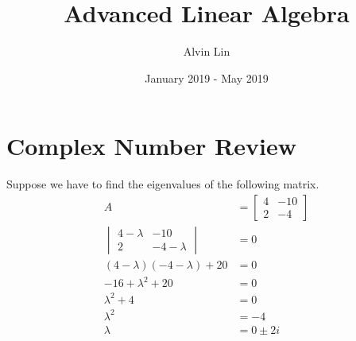 \documentclass{math}
\title{Advanced Linear Algebra}
\author{Alvin Lin}
\date{January 2019 - May 2019}
\begin{document}
\maketitle

\section*{Complex Number Review}
Suppose we have to find the eigenvalues of the following matrix.
\begin{align*}
  A &= \begin{bmatrix}
    4 & -10 \\
    2 & -4
  \end{bmatrix} \\
  \begin{vmatrix}
    4-\lambda & -10 \\
    2 & -4-\lambda
  \end{vmatrix} &= 0 \\
  (4-\lambda)(-4-\lambda)+20 &= 0 \\
  -16+\lambda^2+20 &= 0 \\
  \lambda^2+4 &= 0 \\
  \lambda^2 &= -4 \\
  \lambda &= 0\pm2i
\end{align*}
\end{document}
